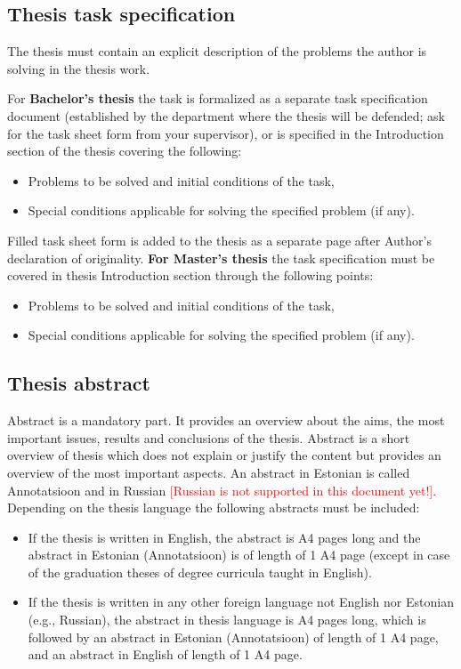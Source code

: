 \subsection{Thesis task specification}

The thesis must contain an explicit description of the problems the author is solving in
the thesis work.

For \textbf{Bachelor’s thesis} the task is formalized as a separate task specification document
(established by the department where the thesis will be defended; ask for the task sheet
form from your supervisor), or is specified in the Introduction section of the thesis
covering the following:
\begin{itemize}
\item Problems to be solved and initial conditions of the task,
\item Special conditions applicable for solving the specified problem (if any).
\end{itemize}
Filled task sheet form is added to the thesis as a separate page after Author’s declaration
of originality.
\textbf{For Master’s thesis} the task specification must be covered in thesis Introduction section
through the following points:
\begin{itemize}
\item  Problems to be solved and initial conditions of the task,
\item Special conditions applicable for solving the specified problem (if any).
\end{itemize}

\subsection{Thesis abstract}

Abstract is a mandatory part. It provides an overview about the aims, the most important
issues, results and conclusions of the thesis. Abstract is a short overview of thesis which
does not explain or justify the content but provides an overview of the most important
aspects. An abstract in Estonian is called Annotatsioon and in Russian \textcolor{red}{[Russian is not supported in this document yet!]}.
Depending on the thesis language the following abstracts must be included:
\begin{itemize}
\item If the thesis is written in English, the abstract is  A4 pages long and the abstract
in Estonian (Annotatsioon) is of length of 1 A4 page (except in case of the
graduation theses of degree curricula taught in English).

\item If the thesis is written in any other foreign language not English nor Estonian (e.g., Russian), the abstract in thesis language is  A4 pages long, which is followed by an abstract in Estonian (Annotatsioon) of length of 1 A4 page, and an abstract in English of length of 1 A4 page.
\end{itemize}


